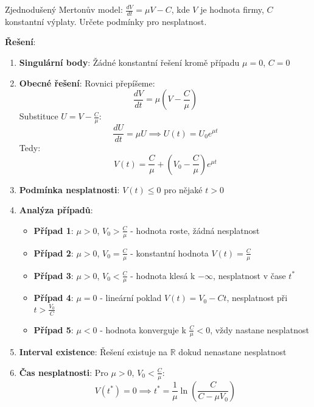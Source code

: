 \begin{example}
    Zjednodušený Mertonův model: $\frac{dV}{dt} = \mu V - C$, kde $V$ je hodnota firmy, $C$ konstantní výplaty. Určete podmínky pro nesplatnost.
    
    \vspace{0.3\baselineskip}
    
    \textbf{Řešení}: 
    \begin{enumerate}
    \item \textbf{Singulární body}: Žádné konstantní řešení kromě případu $\mu = 0$, $C = 0$
    
    \item \textbf{Obecné řešení}: Rovnici přepíšeme:
    \[
    \frac{dV}{dt} = \mu\left(V - \frac{C}{\mu}\right)
    \]
    Substituce $U = V - \frac{C}{\mu}$:
    \[
    \frac{dU}{dt} = \mu U \implies U(t) = U_0 e^{\mu t}
    \]
    Tedy:
    \[
    V(t) = \frac{C}{\mu} + \left(V_0 - \frac{C}{\mu}\right)e^{\mu t}
    \]
    
    \item \textbf{Podmínka nesplatnosti}: $V(t) \leq 0$ pro nějaké $t > 0$
    
    \item \textbf{Analýza případů}:
    \begin{itemize}
    \item \textbf{Případ 1}: $\mu > 0$, $V_0 > \frac{C}{\mu}$ - hodnota roste, žádná nesplatnost
    \item \textbf{Případ 2}: $\mu > 0$, $V_0 = \frac{C}{\mu}$ - konstantní hodnota $V(t) = \frac{C}{\mu}$
    \item \textbf{Případ 3}: $\mu > 0$, $V_0 < \frac{C}{\mu}$ - hodnota klesá k $-\infty$, nesplatnost v čase $t^*$
    \item \textbf{Případ 4}: $\mu = 0$ - lineární poklad $V(t) = V_0 - Ct$, nesplatnost při $t > \frac{V_0}{C}$
    \item \textbf{Případ 5}: $\mu < 0$ - hodnota konverguje k $\frac{C}{\mu} < 0$, vždy nastane nesplatnost
    \end{itemize}
    
    \item \textbf{Interval existence}: Řešení existuje na $\mathbb{R}$ dokud nenastane nesplatnost
    
    \item \textbf{Čas nesplatnosti}: Pro $\mu > 0$, $V_0 < \frac{C}{\mu}$:
    \[
    V(t^*) = 0 \implies t^* = \frac{1}{\mu} \ln\left(\frac{C}{C - \mu V_0}\right)
    \]
    \end{enumerate}
    \end{example}

